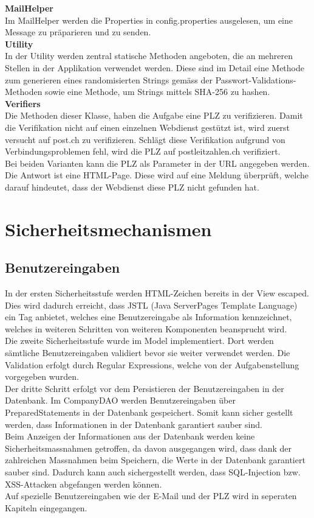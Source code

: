 \documentclass[12pt]{scrartcl}
\begin{document}
\textbf{MailHelper}\\
Im MailHelper werden die Properties in config.properties ausgelesen, um eine Message zu präparieren und zu senden.\\

\textbf{Utility}\\
In der Utility werden zentral statische Methoden angeboten, die an mehreren Stellen in der Applikation verwendet werden. Diese sind im Detail eine Methode zum generieren eines randomisierten Strings gemäss der Passwort-Validations-Methoden sowie eine Methode, um Strings mittels SHA-256 zu hashen.\\

\textbf{Verifiers}\\
Die Methoden dieser Klasse, haben die Aufgabe eine PLZ zu verifizieren. Damit die Verifikation nicht auf einen einzelnen Webdienst gestützt ist, wird zuerst versucht auf post.ch zu verifizieren. Schlägt diese Verifikation aufgrund von Verbindungsproblemen fehl, wird die PLZ auf postleitzahlen.ch verifiziert.\\
Bei beiden Varianten kann die PLZ als Parameter in der URL angegeben werden. Die Antwort ist eine HTML-Page. Diese wird auf eine Meldung überprüft, welche darauf hindeutet, dass der Webdienst diese PLZ nicht gefunden hat.

\section{Sicherheitsmechanismen}
\subsection{Benutzereingaben}
In der ersten Sicherheitsstufe werden HTML-Zeichen bereits in der View escaped. Dies wird dadurch erreicht, dass JSTL (Java ServerPages Template Language) ein Tag anbietet, welches eine Benutzereingabe als Information kennzeichnet, welches in weiteren Schritten von weiteren Komponenten beansprucht wird.\\
Die zweite Sicherheitsstufe wurde im Model implementiert. Dort werden sämtliche Benutzereingaben validiert bevor sie weiter verwendet werden. Die Validation erfolgt durch Regular Expressions, welche von der Aufgabenstellung vorgegeben wurden.\\
Der dritte Schritt erfolgt vor dem Persistieren der Benutzereingaben in der Datenbank. Im CompanyDAO werden Benutzereingaben über PreparedStatements in der Datenbank gespeichert. Somit kann sicher gestellt werden, dass Informationen in der Datenbank garantiert sauber sind.\\
Beim Anzeigen der Informationen aus der Datenbank werden keine Sicherheitsmassnahmen getroffen, da davon ausgegangen wird, dass dank der zahlreichen Massnahmen beim Speichern, die Werte in der Datenbank garantiert sauber sind. Dadurch kann auch sichergestellt werden, dass SQL-Injection bzw. XSS-Attacken abgefangen werden können.\\
Auf spezielle Benutzereingaben wie der E-Mail und der PLZ wird in seperaten Kapiteln eingegangen.
\end{document}
